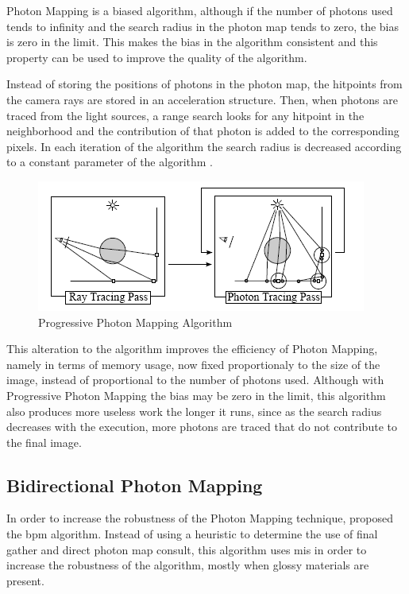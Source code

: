 Photon Mapping is a biased algorithm, although if the number of photons used tends to infinity and the search radius in the photon map tends to zero, the bias is zero in the limit. This makes the bias in the algorithm consistent and this property can be used to improve the quality of the algorithm.

Instead of storing the positions of photons in the photon map, the hitpoints from the camera rays are stored in an acceleration structure. Then, when photons are traced from the light sources, a range search looks for any hitpoint in the neighborhood and the contribution of that photon is added to the corresponding pixels. In each iteration of the algorithm the search radius is decreased according to a constant parameter of the algorithm \citep{Hachisuka}.

\begin{figure}[H]
\centering
\includegraphics[width=0.75\linewidth]{img/ppmDiagram.png}
\caption{\label{img:ppmdiag} Progressive Photon Mapping Algorithm}
\end{figure}

This alteration to the algorithm improves the efficiency of Photon Mapping, namely in terms of memory usage, now fixed proportionaly to the size of the image, instead of proportional to the number of photons used. Although with Progressive Photon Mapping the bias may be zero in the limit, this algorithm also produces more useless work the longer it runs, since as the search radius decreases with the execution, more photons are traced that do not contribute to the final image.

\subsection{Bidirectional Photon Mapping}

In order to increase the robustness of the Photon Mapping technique, \cite{Vorba} proposed the \gls{bpm} algorithm. Instead of using a heuristic to determine the use of final gather and direct photon map consult, this algorithm uses \gls{mis} in order to increase the robustness of the algorithm, mostly when glossy materials are present.

